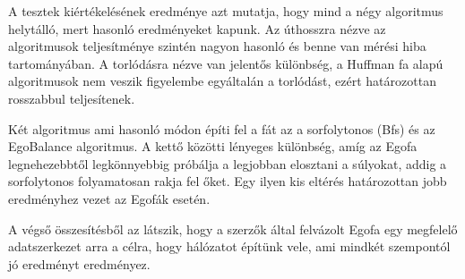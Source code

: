 \documentclass[12pt]{report}
\begin{document}
A tesztek kiértékelésének eredménye azt mutatja, hogy mind a négy algoritmus helytálló, mert hasonló eredményeket kapunk.
Az úthosszra nézve az algoritmusok teljesítménye szintén nagyon hasonló és benne van mérési hiba tartományában.
A torlódásra nézve van jelentős különbség, a Huffman fa alapú algoritmusok nem veszik figyelembe egyáltalán a torlódást, ezért határozottan rosszabbul teljesítenek.
 
Két algoritmus ami hasonló módon építi fel a fát az a sorfolytonos (Bfs) és az EgoBalance algoritmus. 
A kettő közötti lényeges különbség, amíg az Egofa legnehezebbtől legkönnyebbig próbálja a legjobban elosztani a súlyokat, addig a sorfolytonos folyamatosan rakja fel őket.
Egy ilyen kis eltérés határozottan jobb eredményhez vezet az Egofák esetén.

A végső összesítésből az látszik, hogy a szerzők által felvázolt Egofa egy megfelelő adatszerkezet arra a célra, hogy hálózatot építünk vele, ami mindkét szempontól jó eredményt eredményez.





	
\end{document}
